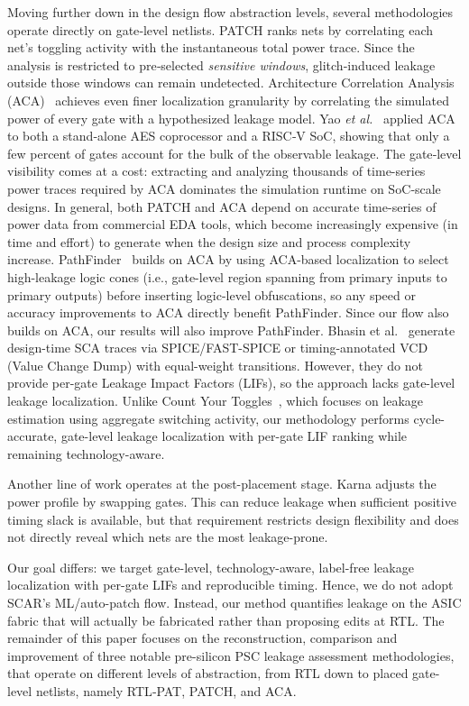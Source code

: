 \documentclass[sigconf]{acmart}
\begin{document}
Moving further down in the design flow abstraction levels, several methodologies operate directly on gate‑level netlists. PATCH \cite{PATCH} ranks nets by correlating each net’s toggling activity with the instantaneous total power trace. Since the analysis is restricted to pre‑selected \emph{sensitive windows}, glitch‑induced leakage outside those windows can remain undetected. Architecture Correlation Analysis (ACA)~\cite{ACA} achieves even finer localization granularity by correlating the simulated power of every gate with a hypothesized leakage model. Yao \emph{et al.}~\cite{GateLevelACA} applied ACA to both a stand‑alone AES coprocessor and a RISC‑V SoC, showing that only a few percent of gates account for the bulk of the observable leakage. The gate‑level visibility comes at a cost: extracting and analyzing thousands of time-series power traces required by ACA dominates the simulation runtime on SoC‑scale designs. In general, both PATCH and ACA depend on accurate time-series of power data from commercial EDA tools, which become increasingly expensive (in time and effort) to generate when the design size and process complexity increase. PathFinder~\cite{PATHFINDER} builds on ACA by using ACA-based localization to select high-leakage logic cones (i.e., gate-level region spanning from primary inputs to primary outputs) before inserting logic-level obfuscations, so any speed or accuracy improvements to ACA directly benefit PathFinder. Since our flow also builds on ACA, our results will also improve PathFinder.
Bhasin et al.~\cite{Bhasin} generate design-time SCA traces via SPICE/FAST-SPICE or timing-annotated VCD (Value Change Dump) with equal-weight transitions. However, they do not provide per-gate Leakage Impact Factors (LIFs), so the approach lacks gate-level leakage localization. Unlike Count Your Toggles~\cite{CountYourToggles}, which focuses on leakage estimation using aggregate switching activity, our methodology performs cycle-accurate, gate-level leakage localization with per-gate LIF ranking while remaining technology-aware.

Another line of work operates at the post-placement stage. Karna \cite{Karna} adjusts the power profile by swapping gates. This can reduce leakage when sufficient positive timing slack is available, but that requirement restricts design flexibility and does not directly reveal which nets are the most leakage-prone. 

Our goal differs: we target gate-level, technology-aware, label-free leakage localization with per-gate LIFs and reproducible timing. Hence, we do not adopt SCAR’s ML/auto-patch flow. Instead, our method quantifies leakage on the ASIC fabric that will actually be fabricated rather than proposing edits at RTL. The remainder of this paper focuses on the reconstruction, comparison and improvement of three notable pre-silicon PSC leakage assessment methodologies, that operate on different levels of abstraction, from RTL down to placed gate-level netlists, namely RTL‑PAT, PATCH, and ACA. 
\end{document}
